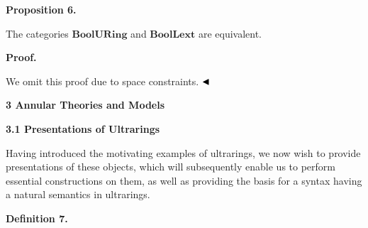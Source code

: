  
 
\par\medskip\noindent\textbf{Proposition 6.}\par
 
 
The categories $\mathbf{BoolURing}$ and $\mathbf{BoolLext}$ are equivalent.\par
 
 
 
 
\par\medskip\noindent\textbf{Proof.}\par
 
 
We omit this proof due to space constraints. $\hfill\blacktriangleleft$\par
 
 
 
 


 
\par\medskip\noindent\textbf{3 Annular Theories and Models}\par
 
 
\par\medskip\noindent\textbf{3.1 Presentations of Ultrarings}\par
 
 
Having introduced the motivating examples of ultrarings, we now wish to provide presentations of these objects, which will subsequently enable us to perform essential constructions on them, as well as providing the basis for a syntax having a natural semantics in ultrarings.\par
 
 
 
\par\medskip\noindent\textbf{Definition 7.}\par
 
 
